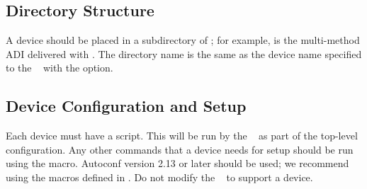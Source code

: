 \subsection{Directory Structure}
\label{sec:adi3-dirs}
A device should be placed in a subdirectory of ;
for example,  is the multi-method ADI
delivered with \mpich.  The directory name is the same as the device
name specified to the \mpich\  with the
 option.

\subsection{Device Configuration and Setup}
\label{sec:adi3-setup}
Each device must have a  script.  This will be run by
the \mpich\  as part of the top-level configuration.
Any other commands that a device needs for setup should be run using
the   macro.  Autoconf version
2.13 or later should be used; we recommend using the macros defined in
.  
Do not modify the \mpich\  to support a device.


